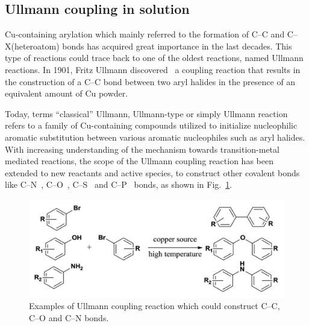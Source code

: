 \documentclass[%
 reprint,
 amsmath,amssymb,
 aps,
prb,
]{revtex4-2}
\begin{document}
\subsection{\label{sec:level2}Ullmann coupling in solution}

Cu-containing arylation which mainly referred to the formation of C--C and C--X(heteroatom) bonds has acquired great importance in the last decades. This type of reactions could trace back to one of the oldest reactions, named Ullmann reactions.
In 1901, Fritz Ullmann discovered~\cite{ullmann_01} a coupling reaction that results in the construction of a C--C bond between two aryl halides in the presence of an equivalent amount of Cu powder.

Today, terms ``classical'' Ullmann, Ullmann-type or simply Ullmann reaction refers to a family of Cu-containing compounds utilized to initialize nucleophilic aromatic substitution between various aromatic nucleophiles such as aryl halides.
With increasing understanding of the mechanism towards transition-metal mediated reactions, the scope of the Ullmann coupling reaction has been extended to new reactants and active species, to construct other covalent bonds like C--N~\cite{ullmann_02, ullmann_03}, C--O~\cite{ullmann_04}, C--S~\cite{ullmann_05} and C--P~\cite{ullmann_21,ullmann_22} bonds, as shown in Fig.~\ref{fig:UllmannCoupling}\cite{ullmann_30}.
\begin{figure}[htb]
\centering
\includegraphics[width=0.75\columnwidth]{Fig/classical.png}%
\caption{Examples of Ullmann coupling reaction which could construct C--C, C--O and C--N bonds.}
\label{fig:UllmannCoupling}
\end{figure}
\end{document}
